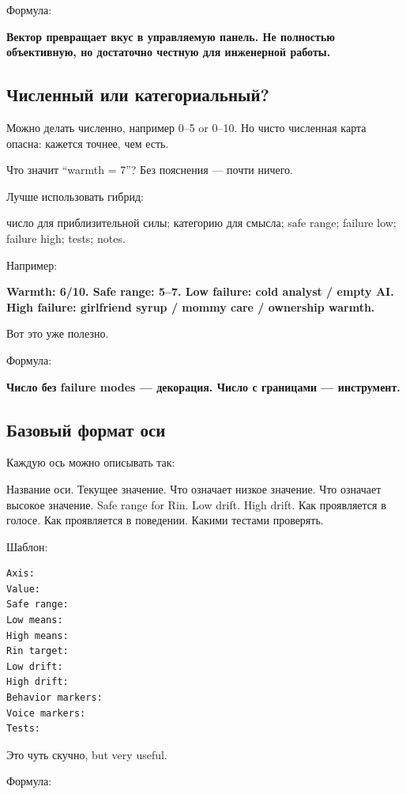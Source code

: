 Формула:

\textbf{Вектор превращает вкус в управляемую панель. Не полностью
объективную, но достаточно честную для инженерной работы.}

\subsection*{Численный или категориальный?}

Можно делать численно, например 0--5 or 0--10. Но чисто численная карта
опасна: кажется точнее, чем есть.

Что значит ``warmth = 7''? Без пояснения --- почти ничего.

Лучше использовать гибрид:

число для приблизительной силы; категорию для смысла; safe range;
failure low; failure high; tests; notes.

Например:

\textbf{Warmth: 6/\hspace{0pt}10. Safe range: 5--7. Low failure: cold analyst /\hspace{0pt}
empty AI. High failure: girlfriend syrup /\hspace{0pt} mommy care /\hspace{0pt} ownership
warmth.}

Вот это уже полезно.

Формула:

\textbf{Число без failure modes --- декорация. Число с границами ---
инструмент.}

\subsection*{Базовый формат оси}

Каждую ось можно описывать так:

Название оси. Текущее значение. Что означает низкое значение. Что
означает высокое значение. Safe range for Rin. Low drift. High drift.
Как проявляется в голосе. Как проявляется в поведении. Какими тестами
проверять.

Шаблон:

\begin{Verbatim}
Axis:
Value:
Safe range:
Low means:
High means:
Rin target:
Low drift:
High drift:
Behavior markers:
Voice markers:
Tests:
\end{Verbatim}

Это чуть скучно, but very useful.

Формула:

